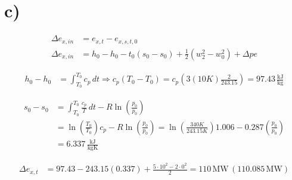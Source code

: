 

\section*{c)}

\begin{align*}
\Delta e_{x, in} &= e_{x, t} - e_{x, s, t, 0} \\
\Delta e_{x, in} &= h_0 - h_0 - t_0 (s_0 - s_0) + \frac{1}{2} \left( w_2^2 - w_0^2 \right) + \Delta p e
\end{align*}

\begin{align*}
h_0 - h_0 &= \int_{T_0}^{T_0} c_p \, dt \Rightarrow c_p (T_0 - T_0) = c_p (3(10K) \frac{2}{243.15}) = 97.43 \, \frac{\text{kJ}}{\text{kg}}
\end{align*}

\begin{align*}
s_0 - s_0 &= \int_{T_0}^{T_0} \frac{c_p}{T} \, dt - R \ln \left( \frac{p_0}{p_0} \right) \\
&= \ln \left( \frac{T_0}{T_0} \right) c_p - R \ln \left( \frac{p_0}{p_0} \right) = \ln \left( \frac{340K}{243.15K} \right) 1.006 - 0.287 \left( \frac{p_0}{p_0} \right) \\
&= 6.337 \, \frac{\text{kJ}}{\text{kgK}}
\end{align*}

\begin{align*}
\Delta e_{x, t} &= 97.43 - 243.15 (0.337) + \frac{5 \cdot 10^2 - 2 \cdot 0^2}{2} = 110 \, \text{MW} \, (110.085 \, \text{MW})
\end{align*}